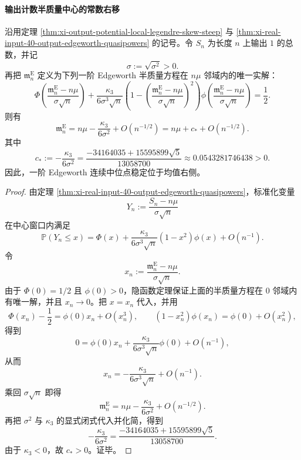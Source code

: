 \paragraph{输出计数半质量中心的常数右移}

\begin{corollary}\label{cor:xi-real-input-40-output-edgeworth-continuous-median-right-shift}
沿用定理 \ref{thm:xi-output-potential-local-legendre-skew-steep} 与
\ref{thm:xi-real-input-40-output-edgeworth-quasipowers} 的记号。令 \(S_n\) 为长度 \(n\) 上输出 \(1\) 的总数，并记
\[
\sigma:=\sqrt{\sigma^2}>0.
\]
再把 \(\mathfrak m_n^{\mathrm E}\) 定义为下列一阶 Edgeworth 半质量方程在 \(n\mu\) 邻域内的唯一实解：
\[
\Phi\!\left(\frac{\mathfrak m_n^{\mathrm E}-n\mu}{\sigma\sqrt n}\right)
+\frac{\kappa_3}{6\sigma^3\sqrt n}
\left(
1-\left(\frac{\mathfrak m_n^{\mathrm E}-n\mu}{\sigma\sqrt n}\right)^2
\right)
\phi\!\left(\frac{\mathfrak m_n^{\mathrm E}-n\mu}{\sigma\sqrt n}\right)
=
\frac12.
\]
则有
\[
\boxed{\;
\mathfrak m_n^{\mathrm E}
=
n\mu-\frac{\kappa_3}{6\sigma^2}+O(n^{-1/2})
=
n\mu+c_*+O(n^{-1/2}).\;}
\]
其中
\[
\boxed{\;
c_*:=-\frac{\kappa_3}{6\sigma^2}
=
\frac{-34164035+15595899\sqrt5}{13058700}
\approx 0.0543281746438>0.\;}
\]
因此，一阶 Edgeworth 连续中位点稳定位于均值右侧。
\end{corollary}
\begin{proof}
由定理 \ref{thm:xi-real-input-40-output-edgeworth-quasipowers}，标准化变量
\[
Y_n:=\frac{S_n-n\mu}{\sigma\sqrt n}
\]
在中心窗口内满足
\[
\mathbb P(Y_n\le x)
=
\Phi(x)+\frac{\kappa_3}{6\sigma^3\sqrt n}(1-x^2)\phi(x)+O(n^{-1}).
\]
令
\[
x_n:=\frac{\mathfrak m_n^{\mathrm E}-n\mu}{\sigma\sqrt n}.
\]
由于 \(\Phi(0)=1/2\) 且 \(\phi(0)>0\)，隐函数定理保证上面的半质量方程在 \(0\) 邻域内有唯一解，并且 \(x_n\to 0\)。把 \(x=x_n\) 代入，并用
\[
\Phi(x_n)-\frac12=\phi(0)x_n+O(x_n^3),
\qquad
(1-x_n^2)\phi(x_n)=\phi(0)+O(x_n^2),
\]
得到
\[
0
=
\phi(0)x_n+\frac{\kappa_3}{6\sigma^3\sqrt n}\phi(0)+O(n^{-1}),
\]
从而
\[
x_n=-\frac{\kappa_3}{6\sigma^3\sqrt n}+O(n^{-1}).
\]
乘回 \(\sigma\sqrt n\) 即得
\[
\mathfrak m_n^{\mathrm E}
=
n\mu-\frac{\kappa_3}{6\sigma^2}+O(n^{-1/2}).
\]
再把 \(\sigma^2\) 与 \(\kappa_3\) 的显式闭式代入并化简，得到
\[
-\frac{\kappa_3}{6\sigma^2}
=
\frac{-34164035+15595899\sqrt5}{13058700}.
\]
由于 \(\kappa_3<0\)，故 \(c_*>0\)。证毕。
\end{proof}

\endinput
